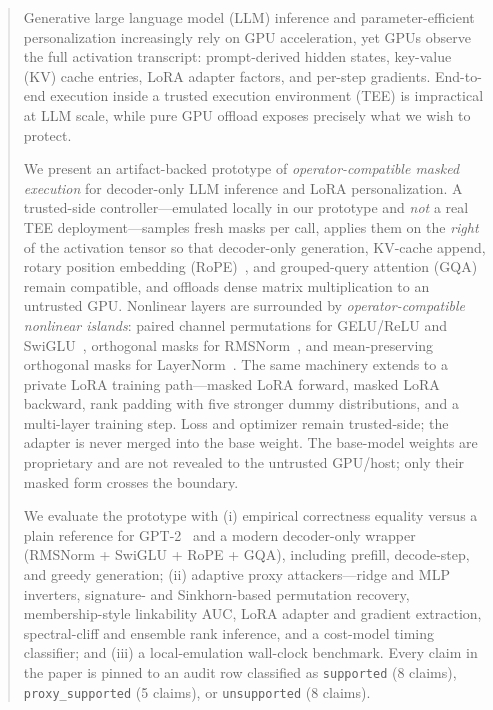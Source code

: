 \begin{abstract}
Generative large language model (LLM) inference and parameter-efficient personalization increasingly rely on GPU acceleration, yet GPUs observe the full activation transcript: prompt-derived hidden states, key-value (KV) cache entries, LoRA adapter factors, and per-step gradients. End-to-end execution inside a trusted execution environment (TEE) is impractical at LLM scale, while pure GPU offload exposes precisely what we wish to protect.

We present an artifact-backed prototype of \emph{operator-compatible masked execution} for decoder-only LLM inference and LoRA personalization. A trusted-side controller---emulated locally in our prototype and \emph{not} a real TEE deployment---samples fresh masks per call, applies them on the \emph{right} of the activation tensor so that decoder-only generation, KV-cache append, rotary position embedding (RoPE)~\cite{su2021roformer}, and grouped-query attention (GQA)~\cite{ainslie2023gqa} remain compatible, and offloads dense matrix multiplication to an untrusted GPU. Nonlinear layers are surrounded by \emph{operator-compatible nonlinear islands}: paired channel permutations for GELU/ReLU and SwiGLU~\cite{shazeer2020glu}, orthogonal masks for RMSNorm~\cite{zhang2019rmsnorm}, and mean-preserving orthogonal masks for LayerNorm~\cite{ba2016layernorm}. The same machinery extends to a private LoRA training path---masked LoRA forward, masked LoRA backward, rank padding with five stronger dummy distributions, and a multi-layer training step. Loss and optimizer remain trusted-side; the adapter is never merged into the base weight. The base-model weights are proprietary and are not revealed to the untrusted GPU/host; only their masked form crosses the boundary.

We evaluate the prototype with (i) empirical correctness equality versus a plain reference for GPT-2~\cite{radford2019language} and a modern decoder-only wrapper (RMSNorm + SwiGLU + RoPE + GQA), including prefill, decode-step, and greedy generation; (ii) adaptive proxy attackers---ridge and MLP inverters, signature- and Sinkhorn-based permutation recovery, membership-style linkability AUC, LoRA adapter and gradient extraction, spectral-cliff and ensemble rank inference, and a cost-model timing classifier; and (iii) a local-emulation wall-clock benchmark. Every claim in the paper is pinned to an audit row classified as \texttt{supported} (8 claims), \texttt{proxy\_supported} (5 claims), or \texttt{unsupported} (8 claims).


\end{abstract}
